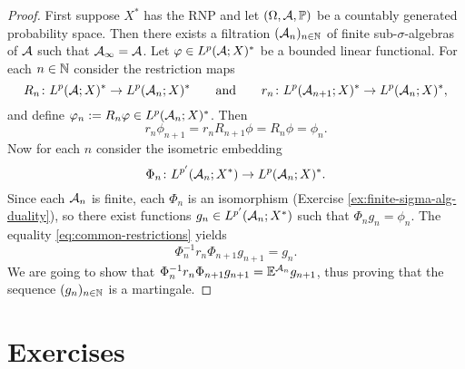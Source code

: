 \begin{proof}
  First suppose $X^*$ has the RNP and let $(\Omega, \mathcal{A}, \mathbb{P})$ be a countably generated probability space.
  Then there exists a filtration $(\mathcal{A}_n)_{n \in \mathbb{N}}$ of finite sub-$\sigma$-algebras of $\mathcal{A}$ such that $\mathcal{A}_\infty = \mathcal{A}$.
  Let $\varphi \in L^p(\mathcal{A};X)^*$ be a bounded linear functional.
  For each $n \in \mathbb{N}$ consider the restriction maps
  \begin{equation*}
    R_n \colon L^{p}(\mathcal{A};X)^* \rightarrow L^{p}(\mathcal{A}_{n};X)^* \qquad \text{and} \qquad r_n \colon L^{p}(\mathcal{A}_{n+1};X)^* \rightarrow L^{p}(\mathcal{A}_{n};X)^*,
  \end{equation*}
  and define $\varphi_n := R_n \varphi \in L^p(\mathcal{A}_n;X)^*$.
  Then
  \begin{equation}\label{eq:common-restrictions}
    r_n \phi_{n+1} = r_n R_{n+1} \phi = R_n \phi = \phi_n.
  \end{equation}
  Now for each $n$ consider the isometric embedding
  \begin{equation*}
    \Phi_n \colon L^{p'}(\mathcal{A}_n;X^*) \rightarrow L^p(\mathcal{A}_n;X)^*.
  \end{equation*}
  Since each $\mathcal{A}_n$ is finite, each $\Phi_n$ is an isomorphism (Exercise \ref{ex:finite-sigma-alg-duality}), so there exist functions $g_n \in L^{p'}(\mathcal{A}_n;X^*)$ such that $\Phi_n g_n = \phi_n$.
  The equality \eqref{eq:common-restrictions} yields
  \begin{equation*}
    \Phi_{n}^{-1} r_n \Phi_{n+1} g_{n+1} = g_n.
  \end{equation*}
  We are going to show that $\Phi_{n}^{-1} r_n \Phi_{n+1} g_{n+1} = \mathbb{E}^{\mathcal{A}_n} g_{n+1}$, thus proving that the sequence $(g_n)_{n \in \mathbb{N}}$ is a martingale.
\end{proof}







\section*{Exercises}



